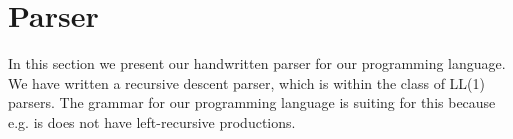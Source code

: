 \section{Parser}

In this section we present our handwritten parser for our programming language. We have written a recursive descent parser, which is within the class of LL(1) parsers. The grammar for our programming language is suiting for this because e.g. is does not have left-recursive productions. 








